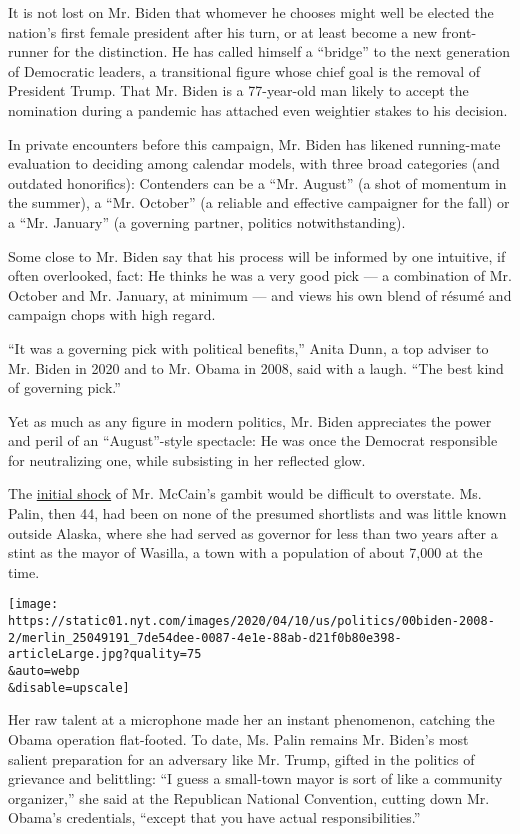 It is not lost on Mr. Biden that whomever he chooses might well be
elected the nation's first female president after his turn, or at least
become a new front-runner for the distinction. He has called himself a
``bridge'' to the next generation of Democratic leaders, a transitional
figure whose chief goal is the removal of President Trump. That Mr.
Biden is a 77-year-old man likely to accept the nomination during a
pandemic has attached even weightier stakes to his decision.

In private encounters before this campaign, Mr. Biden has likened
running-mate evaluation to deciding among calendar models, with three
broad categories (and outdated honorifics): Contenders can be a ``Mr.
August'' (a shot of momentum in the summer), a ``Mr. October'' (a
reliable and effective campaigner for the fall) or a ``Mr. January'' (a
governing partner, politics notwithstanding).

Some close to Mr. Biden say that his process will be informed by one
intuitive, if often overlooked, fact: He thinks he was a very good pick
--- a combination of Mr. October and Mr. January, at minimum --- and
views his own blend of résumé and campaign chops with high regard.

``It was a governing pick with political benefits,'' Anita Dunn, a top
adviser to Mr. Biden in 2020 and to Mr. Obama in 2008, said with a
laugh. ``The best kind of governing pick.''

Yet as much as any figure in modern politics, Mr. Biden appreciates the
power and peril of an ``August''-style spectacle: He was once the
Democrat responsible for neutralizing one, while subsisting in her
reflected glow.

The
\href{https://www.nytimes.com/2008/08/30/us/politics/30veep.html}{initial
shock} of Mr. McCain's gambit would be difficult to overstate. Ms.
Palin, then 44, had been on none of the presumed shortlists and was
little known outside Alaska, where she had served as governor for less
than two years after a stint as the mayor of Wasilla, a town with a
population of about 7,000 at the time.

\texttt{[image: https://static01.nyt.com/images/2020/04/10/us/politics/00biden-2008-2/merlin\_25049191\_7de54dee-0087-4e1e-88ab-d21f0b80e398-articleLarge.jpg?quality=75\\\&auto=webp\\\&disable=upscale]}

Her raw talent at a microphone made her an instant phenomenon, catching
the Obama operation flat-footed. To date, Ms. Palin remains Mr. Biden's
most salient preparation for an adversary like Mr. Trump, gifted in the
politics of grievance and belittling: ``I guess a small-town mayor is
sort of like a community organizer,'' she said at the Republican
National Convention, cutting down Mr. Obama's credentials, ``except that
you have actual responsibilities.''

